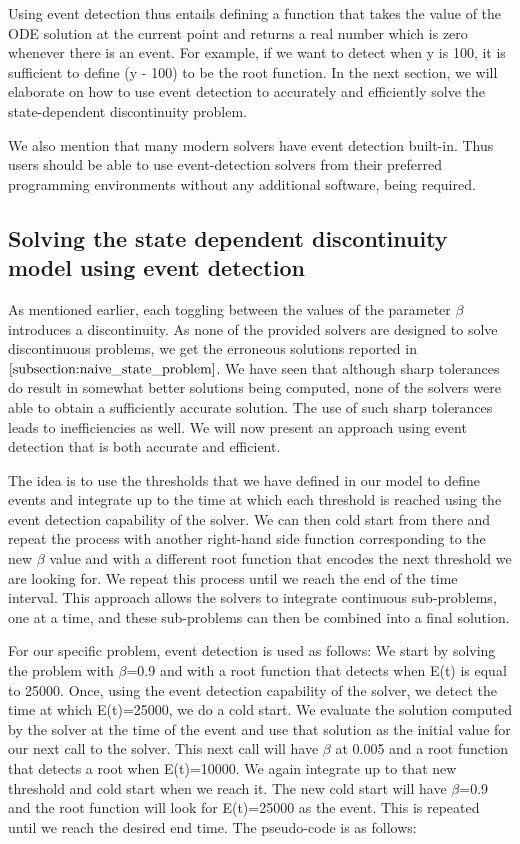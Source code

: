 Using event detection thus entails defining a function that takes the value of the ODE solution at the current point and returns a real number which is zero whenever there is an event. For example, if we want to detect when y is 100, it is sufficient to define (y - 100) to be the root function. In the next section, we will elaborate on how to use event detection to accurately and efficiently solve the state-dependent discontinuity problem.

We also mention that many modern solvers have event detection built-in. Thus users should be able to use event-detection solvers from their preferred programming environments without any additional software, being required.

\subsection{Solving the state dependent discontinuity model using event detection}
\label{subsection:state_with_event_detection}
As mentioned earlier, each toggling between the values of the parameter $\beta$ introduces a discontinuity. As none of the provided solvers are designed to solve discontinuous problems, we get the erroneous solutions reported in $\ref{subsection:naive_state_problem}$. We have seen that although sharp tolerances do result in somewhat better solutions being computed, none of the solvers were able to obtain a sufficiently accurate solution. The use of such sharp tolerances leads to inefficiencies as well. We will now present an approach using event detection that is both accurate and efficient.

The idea is to use the thresholds that we have defined in our model to define events and integrate up to the time at which each threshold is reached using the event detection capability of the solver. We can then cold start from there and repeat the process with another right-hand side function corresponding to the new $\beta$ value and with a different root function that encodes the next threshold we are looking for. We repeat this process until we reach the end of the time interval. This approach allows the solvers to integrate continuous sub-problems, one at a time, and these sub-problems can then be combined into a final solution.

For our specific problem, event detection is used as follows:
We start by solving the problem with $\beta$=0.9 and with a root function that detects when E(t) is equal to 25000. Once, using the event detection capability of the solver, we detect the time at which E(t)=25000, we do a cold start. We evaluate the solution computed by the solver at the time of the event and use that solution as the initial value for our next call to the solver. This next call will have $\beta$ at 0.005 and a root function that detects a root when E(t)=10000. We again integrate up to that new threshold and cold start when we reach it. The new cold start will have $\beta$=0.9 and the root function will look for E(t)=25000 as the event. This is repeated until we reach the desired end time. The pseudo-code is as follows:

